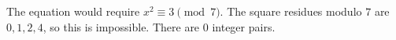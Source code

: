 The equation would require $x^2\equiv3\pmod7$. The square residues modulo $7$ are $0,1,2,4$, so this is impossible. There are $\boxed0$ integer pairs.

